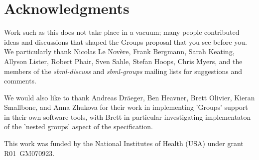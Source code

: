
\section{Acknowledgments}

Work such as this does not take place in a vacuum; many people contributed ideas and discussions that shaped the Groups proposal that you see before you.  We particularly thank Nicolas Le Nov\`{e}re, Frank Bergmann, Sarah Keating, Allyson Lister, Robert Phair, Sven Sahle, Stefan Hoops, Chris Myers, and the members of the \emph{sbml-discuss} and \emph{sbml-groups} mailing lists for suggestions and comments.

We would also like to thank Andreas Dr{\"a}eger, Ben Heavner, Brett Olivier, Kieran Smallbone, and Anna Zhukova for their work in implementing 'Groups' support in their own software tools, with Brett in particular investigating implementaton of the 'nested groups' aspect of the specification.

This work was funded by the National Institutes of Health (USA) under grant R01~GM070923.
